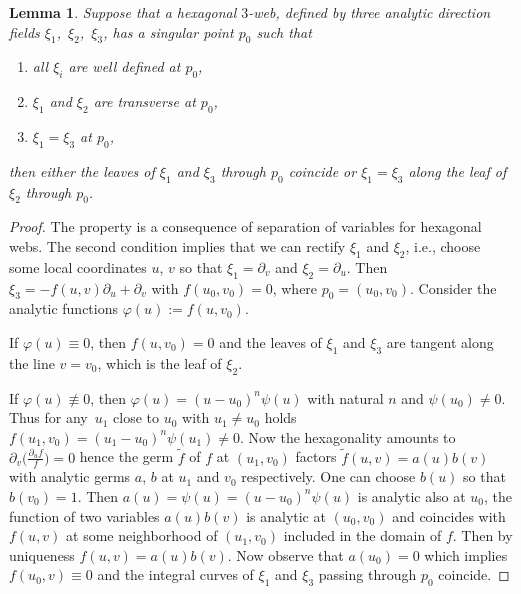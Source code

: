 \documentclass[11pt]{article}
\numberwithin{equation}{section}
\numberwithin{equation}{section}
\newtheorem{Lemma}[Theorem]{Lemma}
\begin{document}
\begin{Lemma}\label{sing}
Suppose that a hexagonal $3$-web, defined by three analytic direction fields $\xi_1$,~$\xi_2$,~$\xi_3$, has a singular point $p_0$ such that
\begin{enumerate}\itemsep=0pt
\item[$(1)$] all $\xi_i$ are well defined at $p_0$,
\item[$(2)$] $\xi_1$ and $\xi_2$ are transverse at $p_0$,
\item[$(3)$] $\xi_1=\xi_3$ at $p_0$,
\end{enumerate}
then either the leaves of $\xi_1$ and $\xi_3$ through $p_0$ coincide or
$\xi_1=\xi_3$ along the leaf of $\xi_2$ through $p_0$.
\end{Lemma}
\begin{proof}
The property is a consequence of separation of variables for hexagonal webs.
The second condition implies that we can rectify $\xi_1$ and $\xi_2$, i.e., choose some local coordinates $u$, $v$ so that $\xi_1=\partial_v$ and $\xi_2=\partial_u$. Then $\xi_3=-f(u,v)\partial_u+\partial_v$ with $f(u_0,v_0)=0$, where $p_0=(u_0,v_0).$
Consider the analytic functions $\varphi(u):=f(u,v_0)$.

If $\varphi(u)\equiv 0$, then $f(u,v_0)=0$ and the leaves of $\xi_1$ and $\xi_3$ are tangent along the line $v=v_0$, which is the leaf of $\xi_2$.

 If $\varphi(u)\not\equiv 0$, then $\varphi(u)=(u-u_0)^n\psi(u)$ with natural $n$ and $\psi(u_0)\ne 0$. Thus for any~$u_1$ close to $u_0$ with $u_1\ne u_0$ holds $f(u_1,v_0)=(u_1-u_0)^n\psi(u_1)\ne 0$. Now the hexagonality amounts to~${\partial_v\bigl(\frac{\partial_uf}{f}\bigr)=0}$ hence the germ $\tilde{f}$ of $f$ at $(u_1,v_0)$ factors $\tilde{f}(u,v)=a(u)b(v)$ with analytic germs $a$, $b$ at $u_1$ and $v_0$ respectively. One can choose $b(u)$ so that $b(v_0)=1$. Then $a(u)=\psi(u)=(u-u_0)^n\psi(u)$ is analytic also at $u_0$, the function of two variables $a(u)b(v)$ is analytic at $(u_0,v_0)$ and coincides with $f(u,v)$ at some neighborhood of $(u_1,v_0)$ included in the domain of $f$. Then by uniqueness $f(u,v)=a(u)b(v)$. Now observe that $a(u_0)=0$ which
implies $f(u_0,v)\equiv 0$ and the integral curves of $\xi_1$ and $\xi_3$ passing through $p_0$ coincide.
\end{proof}
\end{document}
